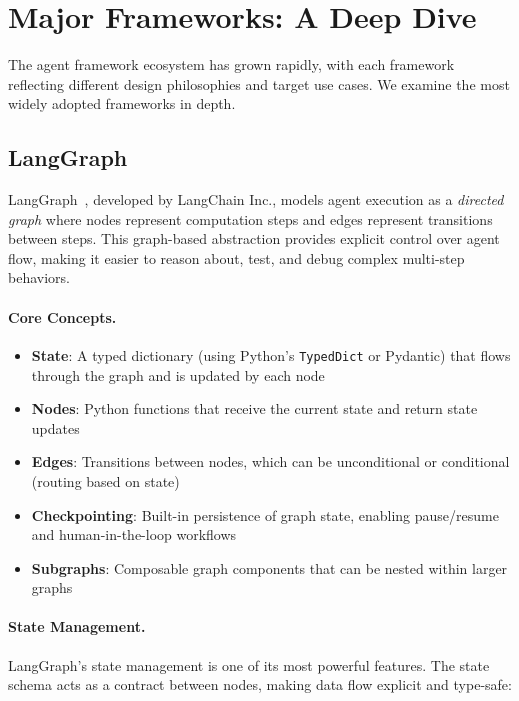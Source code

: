 \section{Major Frameworks: A Deep Dive}
\label{subsec:frameworks}

The agent framework ecosystem has grown rapidly, with each framework reflecting different design philosophies and target use cases. We examine the most widely adopted frameworks in depth.

\subsection{LangGraph}
\label{subsubsec:langgraph}

LangGraph~\cite{langchain2024langgraph}, developed by LangChain Inc., models agent execution as a \emph{directed graph} where nodes represent computation steps and edges represent transitions between steps. This graph-based abstraction provides explicit control over agent flow, making it easier to reason about, test, and debug complex multi-step behaviors.

\paragraph{Core Concepts.}
\label{core-concepts.}

\begin{itemize}
  \item \textbf{State}: A typed dictionary (using Python’s \texttt{TypedDict} or Pydantic) that flows through the graph and is updated by each node
  \item \textbf{Nodes}: Python functions that receive the current state and return state updates
  \item \textbf{Edges}: Transitions between nodes, which can be unconditional or conditional (routing based on state)
  \item \textbf{Checkpointing}: Built-in persistence of graph state, enabling pause/resume and human-in-the-loop workflows
  \item \textbf{Subgraphs}: Composable graph components that can be nested within larger graphs
\end{itemize}

\paragraph{State Management.}
\label{state-management.}

LangGraph’s state management is one of its most powerful features. The state schema acts as a contract between nodes, making data flow explicit and type-safe:

